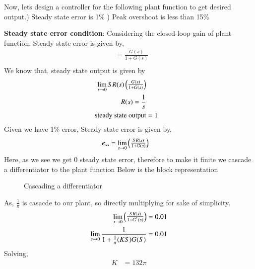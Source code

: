 \begin{enumerate}[label=\thesection.\arabic*.,ref=\thesection.\theenumi]
Now, lets design a controller for the following plant function to get desired output.) Steady state error is 1\% ) Peak overshoot is less than 15\% \newline

\textbf{Steady state error condition}:\newline
Considering the closed-loop gain of plant function.\newline
Steady state error is given by,\newline
\begin{align}
    &= \frac{G(s)}{1 + G(s)}\\
\end{align}
We know that, steady state output is given by 
\begin{align}
    \lim_{s\to0} SR(s)\begin{pmatrix}\frac{G(s)}{1 + G(s)}\end{pmatrix}\\
    R(s) = \frac{1}{s}\\
   \text{ steady state output} &= 1
\end{align}
Given we have 1\% error,\newline
Steady state error is given by,\newline
\begin{align}
    e_{ss} &= \lim_{s\to0} \begin{pmatrix}\frac{SR(s)}{1 + G(s)}\end{pmatrix}
\end{align}   
Here, as we see we get 0 steady state error, therefore to make it finite we cascade a differentiator to the plant function\newline
Below is the block representation\newline
\begin{figure}[!ht]
    \begin{center}
			\resizebox{\columnwidth}{!}{}
	\end{center}
\caption{Cascading a differentiator}
\label{fig:block2}
\end{figure}\newline
As, $\frac{1}{\pi}$ is casacde to our plant, so directly multiplying for sake of simplicity.
\begin{align}
    \lim_{s\to0} \begin{pmatrix}\frac{SR(s)}{1 + G^{'}(s)}\end{pmatrix} &= 0.01\\
    \lim_{s\to0} \frac{1}{1 + \frac{1}{\pi}(KS)G(S)} &= 0.01
\end{align} 
Solving, \\
\begin{align}
    K &= 132\pi
\end{align}

\end{enumerate}

